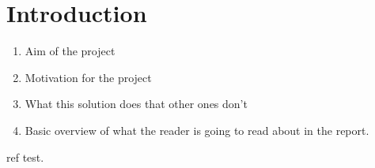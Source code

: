 \section{Introduction}

\begin{enumerate}
    \item Aim of the project
    \item Motivation for the project
    \item What this solution does that other ones don't
    \item Basic overview of what the reader is going to read about in the report.
\end{enumerate}\cite{van2007student} ref test.